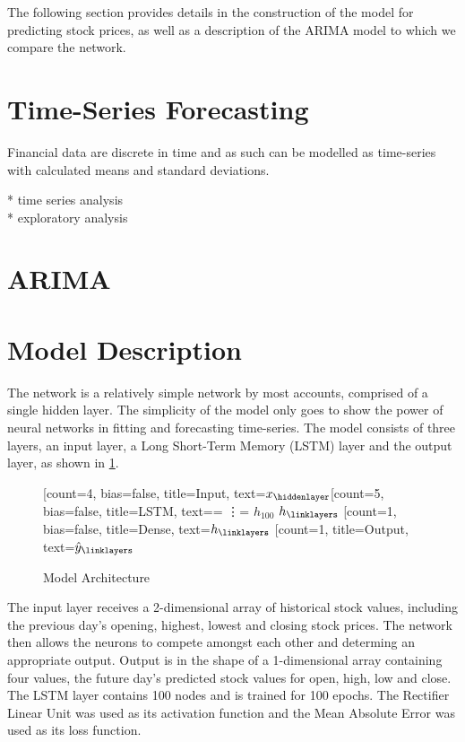 The following section provides details in the construction of the model for predicting stock prices, as well as a description of the ARIMA model to which we compare the network.

\section{Time-Series Forecasting}
Financial data are discrete in time and as such can be modelled as time-series with calculated means and standard deviations.

* time series analysis\\
* exploratory analysis
\section{ARIMA}


\section{Model Description}
The network is a relatively simple network by most accounts, comprised of a single hidden layer. The simplicity of the model only goes to show the power of neural networks in fitting and forecasting time-series. The model consists of three layers, an input layer, a Long Short-Term Memory (LSTM) layer and the output layer, as shown in \ref{tab:model_arch}.

\begin{figure}[h]
    \centering
    \begin{neuralnetwork}[height=4]
        \newcommand{\x}[2]{$x_#2$}
        \newcommand{\y}[2]{$\hat{y}_#2$}
        \newcommand{\h}[2]{$h_#2$}
        \newcommand{\hlast}[2]{\ifnum4=#2 \vdots \else \ifnum5=#2 $h_{100}$ \else $h_#2$ \fi \fi}
        [count=4, bias=false, title=Input, text=\x]
        \hiddenlayer[count=5, bias=false, title=LSTM, text=\hlast] 
        \linklayers
        \hiddenlayer[count=1, bias=false, title=Dense, text=\h]
        \linklayers
        \outputlayer[count=1, title=Output, text=\y] 
        \linklayers
    \end{neuralnetwork}
    \caption{Model Architecture}
    \label{tab:model_arch}
\end{figure}

The input layer receives a 2-dimensional array of historical stock values, including the previous day's opening, highest, lowest and closing stock prices. The network then allows the neurons to compete amongst each other and determing an appropriate output. Output is in the shape of a 1-dimensional array containing four values, the future day's predicted stock values for open, high, low and close. The LSTM layer contains 100 nodes and is trained for 100 epochs. The Rectifier Linear Unit was used as its activation function and the Mean Absolute Error was used as its loss function.

